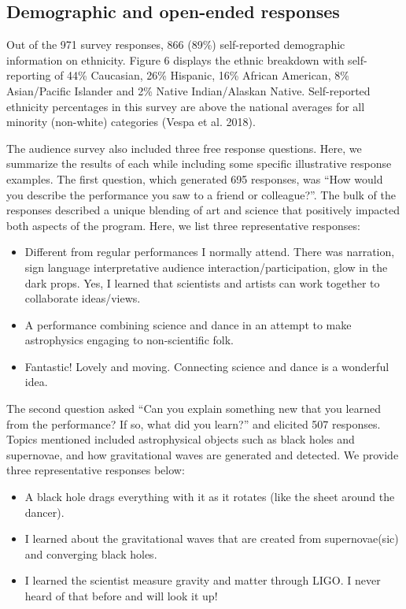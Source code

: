 \documentclass[11.5pt]{sig-alternate} %
\begin{document}
\begin{large}
\subsection*{Demographic and open-ended responses}

Out of the 971 survey responses, 866 (89\%) self-reported demographic information on ethnicity.  Figure 6 displays the ethnic breakdown with self-reporting of 44\% Caucasian, 26\% Hispanic, 16\% African American, 8\% Asian/Pacific Islander and 2\% Native Indian/Alaskan Native.  Self-reported ethnicity percentages in this survey are above the national averages for all minority (non-white) categories (Vespa et al. 2018).

The audience survey also included three free response questions.  Here, we summarize the results of each while including some specific illustrative response examples.  The first question, which generated 695 responses, was “How would you describe the performance you saw to a friend or colleague?”.  The bulk of the responses described a unique blending of art and science that positively impacted both aspects of the program.  Here, we list three representative responses:


\begin{itemize}
    \item Different from regular performances I normally attend. There was narration, sign language interpretative audience interaction/participation, glow in the dark props. Yes, I learned that scientists and artists can work together to collaborate ideas/views.
    \item A performance combining science and dance in an attempt to make astrophysics engaging to non-scientific folk.
    \item Fantastic! Lovely and moving. Connecting science and dance is a wonderful idea.
\end{itemize}

The second question asked “Can you explain something new that you learned from the performance? If so, what did you learn?” and elicited 507 responses.  Topics mentioned included astrophysical objects such as black holes and supernovae, and how gravitational waves are generated and detected.  We provide three representative responses below:

\begin{itemize}
    \item A black hole drags everything with it as it rotates (like the sheet around the dancer).
    \item I learned about the gravitational waves that are created from supernovae(sic) and converging black holes.
    \item I learned the scientist measure gravity and matter through LIGO. I never heard of that before and will look it up!
\end{itemize}


\end{large}
\end{document}
